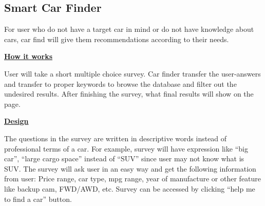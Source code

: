 \documentclass[12pt]{article}
\begin{document}
\subsection{Smart Car Finder}
For user who do not have a target car in mind or do not have knowledge about cars, car find will give them recommendations according to their needs.\par
\textbf{\underline{How it works}}\par
User will take a short multiple choice survey. Car finder transfer the user-answers and transfer to proper keywords to browse the database and filter out the undesired results. After finishing the survey, what final results will show on the page.\par
\textbf{\underline{Design}}\par
The questions in the survey are written in descriptive words instead of professional terms of a car. For example, survey will have expression like ``big car'', ``large cargo space'' instead of ``SUV'' since user may not know what is SUV. The survey will ask user in an easy way and get the following information from user: Price range, car type, mpg range, year of manufacture or other feature like backup cam, FWD/AWD, etc. Survey can be accessed by clicking ``help me to find a car'' button. 
\end{document}
